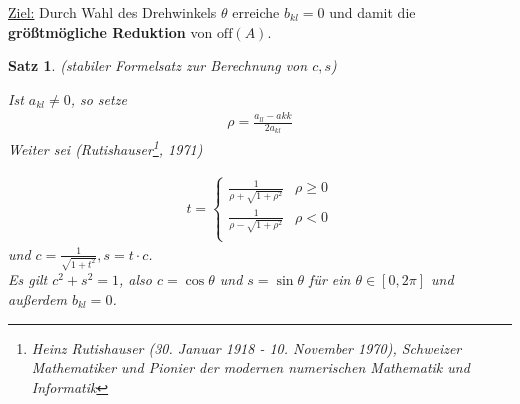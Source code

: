 \documentclass[%
a4paper,
11pt,		%
]
{scrartcl}
\newcommand{\off}{\text{off}}
\theoremstyle{plain}
\theoremstyle{plain}
\newtheorem{mysatz}[mydef]{Satz}
\theoremstyle{plain}
\theoremstyle{plain}
\begin{document}
\uline{Ziel:} Durch Wahl des Drehwinkels $\theta$ erreiche $b_{kl}=0$ und damit die \textbf{größtmögliche Reduktion} von $\off(A)$.

\begin{mysatz}
(stabiler Formelsatz zur Berechnung von $c,s$)

Ist $a_{kl} \neq 0$, so setze
\begin{align*}
\rho = \frac{a_{ll}-a{kk}}{2a_{kl}}
\end{align*}
Weiter sei (Rutishauser\footnote{Heinz Rutishauser (30. Januar 1918 - 10. November 1970), Schweizer Mathematiker und Pionier der modernen numerischen Mathematik und Informatik}, 1971)
 
\begin{align*}
t = 
\begin{cases}
\frac{1}{\rho + \sqrt{1+\rho^2}} & \rho \geq 0\\
\frac{1}{\rho - \sqrt{1+\rho^2}} & \rho < 0\\
\end{cases}
\end{align*}
und $c = \frac{1}{\sqrt{1+t^2}}, s=t \cdot  c$.\\

Es gilt $c^2 + s^2 = 1$, also $c = \cos \theta$ und  $s = \sin \theta$ für ein $\theta \in \left[0,2 \pi \right]$ und außerdem $b_{kl} = 0$.
\end{mysatz}


\end{document}
